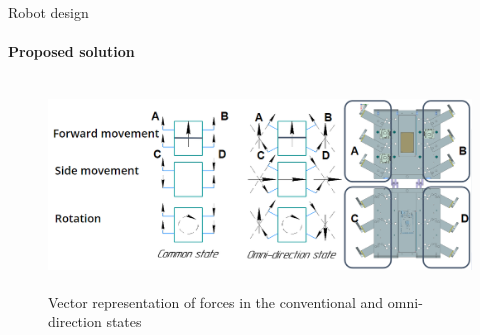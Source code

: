 \documentclass[aspectratio=169]{beamer}
\begin{document}
\begin{frame}[t]{Robot design}
    \framesubtitle{Proposed solution}
    \vspace{-0.8cm}
    \begin{figure}[H]
        \centering\includegraphics[height=5.5cm,width=1\textwidth,keepaspectratio]{omni_rot.png}
        \caption*{Vector representation of forces in  the conventional and omni-direction states}
    \end{figure}
\end{frame}
\end{document}
